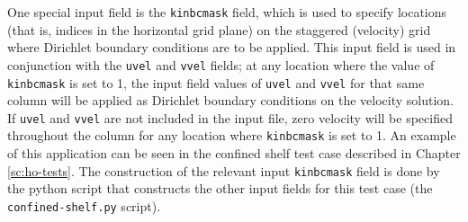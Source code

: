 One special input field is the \texttt{kinbcmask} field, which is used to specify locations (that is,
indices in the horizontal grid plane) on the staggered (velocity) grid where Dirichlet boundary 
conditions are to be applied. This input field is used in conjunction with the \texttt{uvel} and 
\texttt{vvel} fields; at any location where the value of \texttt{kinbcmask} is set to 1, the input field
values of \texttt{uvel} and \texttt{vvel} for that same column will be applied as Dirichlet boundary
conditions on the velocity solution. If \texttt{uvel} and \texttt{vvel} are not included in the input file, 
zero velocity will be specified throughout the column for any location where \texttt{kinbcmask} is 
set to 1. An example of this application can be seen in the confined shelf test case described 
in Chapter \ref{sc:ho-tests}. The construction of the relevant input \texttt{kinbcmask} field 
is done by the python script that constructs the other input fields for this test case 
(the \texttt{confined-shelf.py} script).  


